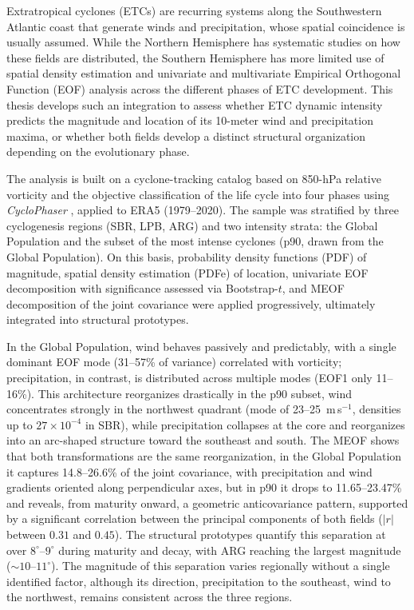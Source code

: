 Extratropical cyclones (ETCs) are recurring systems along the Southwestern Atlantic coast that generate winds and precipitation, whose spatial coincidence is usually assumed.
While the Northern Hemisphere has systematic studies on how these fields are distributed, the Southern Hemisphere has more limited use of spatial density estimation and univariate and multivariate Empirical Orthogonal Function (EOF) analysis across the different phases of ETC development.
This thesis develops such an integration to assess whether ETC dynamic intensity predicts the magnitude and location of its 10-meter wind and precipitation maxima, or whether both fields develop a distinct structural organization depending on the evolutionary phase.

The analysis is built on a cyclone-tracking catalog based on 850-hPa relative vorticity \citep{gramcianinov2020analysis} and the objective classification of the life cycle into four phases using \textit{CycloPhaser} \citep{coutodesouza2024new, deSouza2025CycloPhaser}, applied to ERA5 (1979--2020).
The sample was stratified by three cyclogenesis regions (SBR, LPB, ARG) and two intensity strata: the Global Population and the subset of the most intense cyclones (p90, drawn from the Global Population).
On this basis, probability density functions (PDF) of magnitude, spatial density estimation (PDFe) of location, univariate EOF decomposition with significance assessed via Bootstrap-$t$, and MEOF decomposition of the joint covariance were applied progressively, ultimately integrated into structural prototypes.

In the Global Population, wind behaves passively and predictably, with a single dominant EOF mode (31--57\% of variance) correlated with vorticity; precipitation, in contrast, is distributed across multiple modes (EOF1 only 11--16\%).
This architecture reorganizes drastically in the p90 subset, wind concentrates strongly in the northwest quadrant (mode of 23--25~m\,s$^{-1}$, densities up to $27\times10^{-4}$ in SBR), while precipitation collapses at the core and reorganizes into an arc-shaped structure toward the southeast and south.
The MEOF shows that both transformations are the same reorganization, in the Global Population it captures 14.8--26.6\% of the joint covariance, with precipitation and wind gradients oriented along perpendicular axes, but in p90 it drops to 11.65--23.47\% and reveals, from maturity onward, a geometric anticovariance pattern, supported by a significant correlation between the principal components of both fields ($|r|$ between $0.31$ and $0.45$).
The structural prototypes quantify this separation at over $8^{\circ}$--$9^{\circ}$ during maturity and decay, with ARG reaching the largest magnitude (${\sim}10$--$11^{\circ}$).
The magnitude of this separation varies regionally without a single identified factor, although its direction, precipitation to the southeast, wind to the northwest, remains consistent across the three regions.

